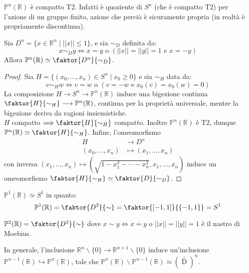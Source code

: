 \begin{oss}
$\mathbb{P}^n(\mathbb{R})$ è compatto T2. Infatti è quoziente di $S^n$ (che è compatto T2) per l'azione di un gruppo finito, azione che perciò è sicuramente propria (in realtà è propriamente discontinua).
\end{oss}

\begin{prop}
Sia $D^n=\{x \in \mathbb{R}^n \mid ||x|| \le 1 \}$, e sia $\sim _D$ definita da:
$$x \sim _D y \Longleftrightarrow x=y \text{ o } (||x||=||y||=1 \text{ e } x=-y)$$
Allora $\mathbb{P}^n(\mathbb{R}) \simeq \faktor{D^n}{\sim _D}$.
\end{prop}
\begin{proof}
Sia $H=\{(x_0,\dots,x_n) \in S^n \mid x_0 \ge 0 \}$ e sia $\sim _H$ data da:
$$v \sim _H w \Longleftrightarrow v=w \text{ o } (v=-w \text{ e } x_0(v)=x_0(w)=0)$$
La composizione $H \longrightarrow S^n \longrightarrow \mathbb{P}^n(\mathbb{R})$ induce una bigezione continua $\faktor{H}{\sim _H} \longrightarrow \mathbb{P}^n(\mathbb{R})$, continua per la proprietà universale, mentre la bigezione deriva da ragioni insiemistiche.\\
$H$ compatto $\Longrightarrow \faktor{H}{\sim _H}$ compatto. Inoltre $\mathbb{P}^n(\mathbb{R})$ è T2, dunque $\mathbb{P}^n(\mathbb{R}) \simeq \faktor{H}{\sim _H}$. Infine, l'omeomorfismo
\begin{align*}
H &\longrightarrow D^n \\
(x_0,\dots,x_n) &\longmapsto (x_1,\dots,x_n)
\end{align*}
con inversa $(x_1,\dots,x_n) \longmapsto (\sqrt{1-x_1^2-\cdots-x_n^2},x_1,\dots,x_n)$ induce un omeomorfismo $\faktor{H}{\sim _H} \simeq \faktor{D}{\sim _D}$.
\end{proof}

\begin{oss}
$\mathbb{P}^1(\mathbb{R}) \simeq S^1$ in quanto:
$$ \mathbb{P}^1(\mathbb{R})=\faktor{D^2}{\sim}=\faktor{[-1,1]}{\{-1,1\}}=S^1 $$
\end{oss}

\begin{oss}
$\mathbb{P}^2(\mathbb{R})=\faktor{D^2}{\sim}$ dove $x\sim y \Longleftrightarrow x=y \text{ o } ||x||=||y||=1$ è il nastro di Moebius.
\end{oss}

In generale, l'inclusione $\mathbb{R}^n \smallsetminus \{0\} \longrightarrow \mathbb{R}^{n+1} \smallsetminus \{0\}$ induce un'inclusione $\mathbb{P}^{n-1}(\mathbb{R}) \hookrightarrow \mathbb{P}^n(\mathbb{R})$, tale che $\mathbb{P}^n(\mathbb{R})\smallsetminus \mathbb{P}^{n-1}(\mathbb{R}) \simeq (\mathop D\limits ^\circ)^n$.

